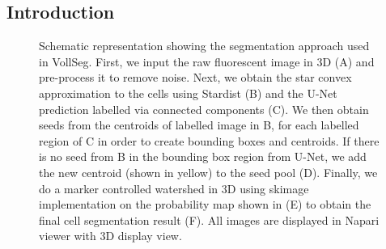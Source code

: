 \documentclass[letterpaper,compsoc,twoside,onecolumn]{IEEEtran}
\begin{document}
\subsection{Introduction%
  \label{introduction}%
}
\begin{figure}[]\noindent{}
\caption{Schematic representation showing the segmentation approach used in VollSeg. First, we input the raw fluorescent image in 3D (A) and pre-process it to remove noise. Next, we obtain the star convex approximation to the cells using Stardist (B) and the U-Net prediction labelled via connected components (C). We then obtain seeds from the centroids of labelled image in B, for each labelled region of C in order to create bounding boxes and centroids. If there is no seed from B in the bounding box region from U-Net, we add the new centroid (shown in yellow) to the seed pool (D). Finally, we do a marker controlled watershed in 3D using skimage implementation on the probability map shown in (E) to obtain the final cell segmentation result (F). All images are displayed in Napari viewer with 3D display view.}

\end{figure}
\end{document}
